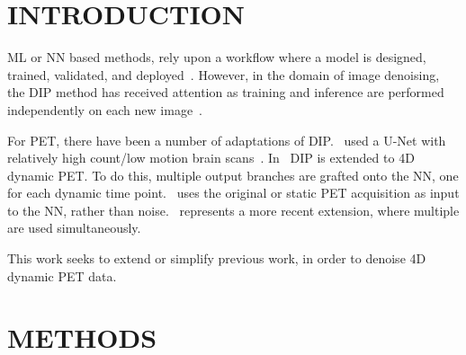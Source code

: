\section{INTRODUCTION} \label{sec:introduction}
     \acrlong{ML} or \gls{NN} based methods, rely upon a workflow where a model is designed, trained, validated, and deployed~\cite{Krose2011AnNetworks}. %
    However, in the domain of image denoising, the \gls{DIP} method has received attention as training and inference are performed independently on each new image~\cite{Ulyanov2018DeepPrior}. %
    
    For \acrshort{PET}, there have been a number of adaptations of \gls{DIP}.~\cite{Gong2019PETPrior} used a U-Net with relatively high count/low motion brain scans~\cite{Weng2015U-Net:Segmentation}. In~\cite{Hashimoto20214DNetwork} \gls{DIP} is extended to \acrshort{4D} dynamic \acrshort{PET}. To do this, multiple output branches are grafted onto the \gls{NN}, one for each dynamic time point.~\cite{Hashimoto2019DynamicDatasets} uses the original or static \acrshort{PET} acquisition as input to the \gls{NN}, rather than noise.~\cite{Yang2022SimultaneousPrior} represents a more recent extension, where multiple  are used simultaneously.
    
    This work seeks to extend or simplify previous work, in order to denoise \acrshort{4D} dynamic \acrshort{PET} data.

    
\section{METHODS}\label{sec:methods}
